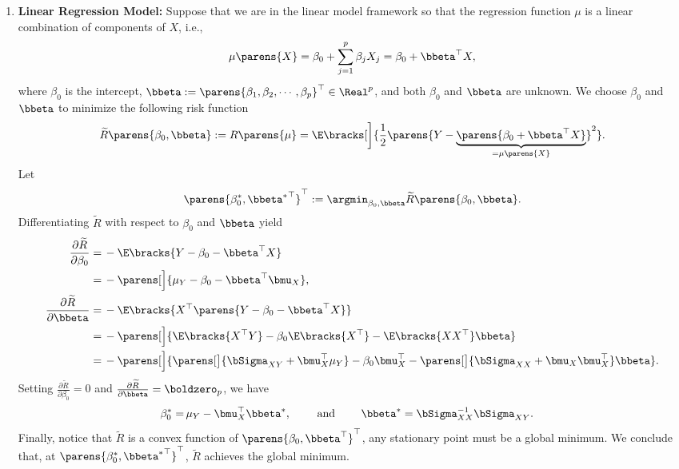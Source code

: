 \documentclass[12pt]{article}
\begin{document}
\begin{enumerate}[label=\textbf{\arabic*.}]
	\item \textbf{Linear Regression Model:} Suppose that we are in the linear model framework so that the regression function $\mu$ is a linear combination of components of $X$, i.e., 
	\begin{align}\label{eq-linear-model-random-x}
		\mu \parens{X} = \beta_0 + \sum_{j=1}^p \beta_j X_j = \beta_0 + \bbeta^\top X, 
	\end{align}
	where $\beta_0$ is the intercept, $\bbeta := \parens{\beta_1, \beta_2, \cdots, \beta_p}^\top \in \Real^p$, and both $\beta_0$ and $\bbeta$ are unknown. We choose $\beta_0$ and $\bbeta$ to minimize the following risk function 
	\begin{align*}
		\widetilde{R} \parens{\beta_0, \bbeta} := R \parens{\mu} = \E \bracks[\bigg]{\frac{1}{2} \parens{Y - \underbrace{\parens{\beta_0 + \bbeta^\top X}}_{=\mu \parens{X}}}^2}. 
	\end{align*}
	Let 
	\begin{align*}
		\parens{\beta_0^*, {\bbeta^*}^{\top}}^{\top} := \argmin_{\beta_0, \bbeta} \widetilde{R} \parens{\beta_0, \bbeta}. 
	\end{align*}
	Differentiating $\widetilde{R}$ with respect to $\beta_0$ and $\bbeta$ yield 
	\begin{align*}
		\frac{\partial \widetilde{R}}{\partial \beta_0} = & \, - \E \bracks{Y - \beta_0 - \bbeta^\top X} \\ 
		= & \, - \parens[\Big]{\mu_Y - \beta_0 - \bbeta^\top \bmu_X} , \\ 
		\frac{\partial \widetilde{R}}{\partial \bbeta} = & \, - \E \bracks{X^\top \parens{Y - \beta_0 - \bbeta^\top X}} \\ 
		= & \, - \parens[\Big]{\E \bracks{X^\top Y} - \beta_0 \E \bracks{X^\top} - \E \bracks{X X^{\top}} \bbeta} \\ 
		= & \, - \parens[\Big]{\parens[\big]{\bSigma_{XY} + \bmu_X^\top \mu_Y} - \beta_0 \bmu_X^\top - \parens[\big]{\bSigma_{XX} + \bmu_X \bmu_X^\top} \bbeta}. 
	\end{align*}
	Setting $\frac{\partial \widetilde{R}}{\partial \beta_0} = 0$ and $\frac{\partial \widetilde{R}}{\partial \bbeta} = \boldzero_p$, we have 
	\begin{align*}
		\beta_0^* = & \, \mu_Y - \bmu_X^\top \bbeta^*, \qquad \text{ and } \qquad
		\bbeta^* = \bSigma_{XX}^{-1} \bSigma_{XY}. 
	\end{align*}
	Finally, notice that $\widetilde{R}$ is a convex function of $\parens{\beta_0, \bbeta^\top}^{\top}$, any stationary point must be a global minimum. We conclude that, at $\parens{\beta_0^*, {\bbeta^*}^{\top}}^\top$, $\widetilde{R}$ achieves the global minimum. 
	

\end{enumerate}
\end{document}
